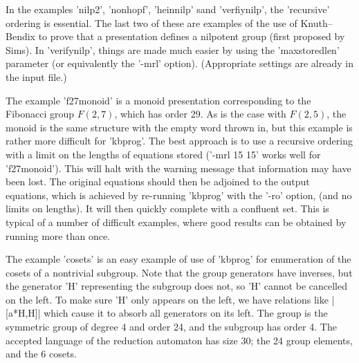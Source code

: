 In the examples 'nilp2', 'nonhopf', 'heinnilp' sand 'verfiynilp', the
'recursive' ordering is essential. The last two of these are examples of
the use of Knuth--Bendix to prove that a presentation defines a nilpotent
group (first proposed by Sims). In 'verifynilp', things are made much
easier by using the 'maxstoredlen' parameter (or equivalently the '-mrl'
option). (Appropriate settings are already in the input file.)

The example 'f27monoid' is a monoid presentation
corresponding to the Fibonacci group $F(2,7)$, which has order 29.  As is
the case with $F(2,5)$, the monoid is the same structure with the empty
word thrown in, but this example is rather more difficult for 'kbprog'.
The best approach is to use a recursive ordering with a limit on the
lengths of equations stored ('-mrl 15 15' works well for 'f27monoid').
This will halt with the warning message that information may have been lost.
The original equations should then be adjoined to the output equations,
which is achieved by re-running 'kbprog' with the '-ro' option,
(and no limits on lengths).
It will then quickly complete with a confluent set. This is typical of a
number of difficult examples, where good results can be obtained by running
more than once.

The example 'cosets' is an easy example of use of 'kbprog' for enumeration
of the cosets of a nontrivial subgroup.
Note that the group generators have inverses, but the generator
'H' representing the subgroup does not, so 'H' cannot be
cancelled on the left. To make sure 'H' only appears on the left,
we have relations  like |[a*H,H]| which cause it to absorb all generators
on its left. The group is the symmetric group of
degree 4 and order 24, and the subgroup has order 4. The accepted language
of the reduction automaton has size 30; the 24 group elements, and the 6
cosets.
